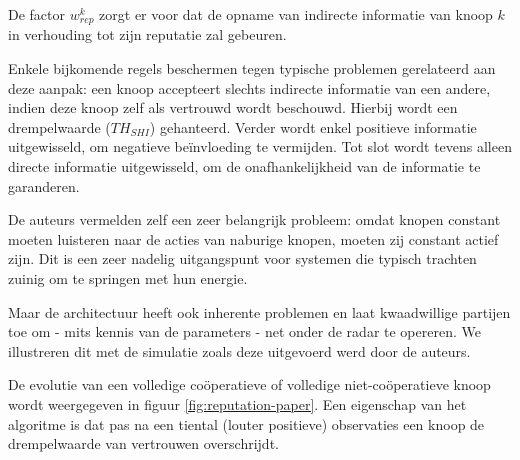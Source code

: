 De factor $w^k_{rep}$ zorgt er voor dat de opname van indirecte informatie van
knoop $k$ in verhouding tot zijn reputatie zal gebeuren.

Enkele bijkomende regels beschermen tegen typische problemen gerelateerd aan
deze aanpak: een knoop accepteert slechts indirecte informatie van een andere,
indien deze knoop zelf als vertrouwd wordt beschouwd. Hierbij wordt een
drempelwaarde ($TH_{SHI}$) gehanteerd. Verder wordt enkel positieve informatie
uitgewisseld, om negatieve be\"invloeding te vermijden. Tot slot wordt tevens
alleen directe informatie uitgewisseld, om de onafhankelijkheid van de
informatie te garanderen.

De auteurs vermelden zelf een zeer belangrijk probleem: omdat knopen constant
moeten luisteren naar de acties van naburige knopen, moeten zij constant actief
zijn. Dit is een zeer nadelig uitgangspunt voor systemen die typisch trachten
zuinig om te springen met hun energie.

Maar de architectuur heeft ook inherente problemen en laat kwaadwillige
partijen toe om - mits kennis van de parameters - net onder de radar te
opereren. We illustreren dit met de simulatie zoals deze uitgevoerd werd door
de auteurs.

De evolutie van een volledige co\"operatieve of volledige niet-co\"operatieve
knoop wordt weergegeven in figuur \ref{fig:reputation-paper}. Een eigenschap
van het algoritme is dat pas na een tiental (louter positieve) observaties een
knoop de drempelwaarde van vertrouwen overschrijdt.

